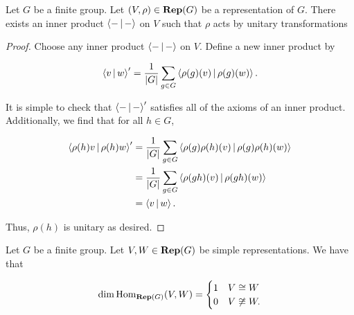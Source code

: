 \begin{prop}Let $G$ be a finite group. Let $(V,\rho)\in {\bf Rep}(G)$ be a representation of $G$. There exists an inner product $\Braket{- | -}$ on $V$ such that $\rho$ acts by unitary transformations
\end{prop}
\begin{proof} Choose any inner product $\Braket{-|-}$ on $V$. Define a new inner product by

$$\Braket{v|w}'=\frac{1}{|G|}\sum_{g\in G}\Braket{\rho(g)(v)|\rho(g)(w)}.$$

It is simple to check that $ \Braket{-|-}'$ satisfies all of the axioms of an inner product. Additionally, we find that for all $h\in G$,

\begin{align*}
\Braket{\rho(h)v|\rho(h)w}'&=\frac{1}{|G|}\sum_{g\in G}\Braket{\rho(g)\rho(h)(v)|\rho(g)\rho(h)(w)}\\
&=\frac{1}{|G|}\sum_{g\in G}\Braket{\rho(gh)(v)|\rho(gh)(w)}\\
&=\Braket{v|w}.
\end{align*}

Thus, $\rho(h)$ is unitary as desired.

\end{proof}
\begin{prop}\label{schur-lemma-reps} Let $G$ be a finite group. Let $V,W\in {\bf Rep}(G)$ be simple representations. We have that

$$\dim\operatorname{Hom}_{{\bf Rep}(G)}(V,W)=
\begin{cases}
1 & V\cong W\\
0 & V\not\cong W.
\end{cases}$$
\end{prop}
